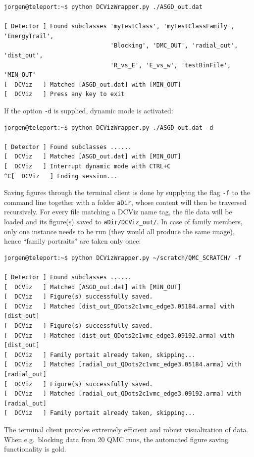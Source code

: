 \begin{verbatim}
jorgen@teleport:~$ python DCVizWrapper.py ./ASGD_out.dat 

[ Detector ] Found subclasses 'myTestClass', 'myTestClassFamily', 'EnergyTrail', 
                              'Blocking', 'DMC_OUT', 'radial_out', 'dist_out', 
                              'R_vs_E', 'E_vs_w', 'testBinFile', 'MIN_OUT'
[  DCViz   ] Matched [ASGD_out.dat] with [MIN_OUT]
[  DCViz   ] Press any key to exit
\end{verbatim}

If the option \verb+-d+ is supplied, dynamic mode is activated:

\begin{verbatim}
jorgen@teleport:~$ python DCVizWrapper.py ./ASGD_out.dat -d

[ Detector ] Found subclasses ......
[  DCViz   ] Matched [ASGD_out.dat] with [MIN_OUT]
[  DCViz   ] Interrupt dynamic mode with CTRL+C
^C[  DCViz   ] Ending session...
\end{verbatim}

Saving figures through the terminal client is done by supplying the flag \verb+-f+ to the command line together with a folder \verb+aDir+, whose content will then be traversed recursively. For every file matching a DCViz name tag, the file data will be loaded and its figure(s) saved to \verb+aDir/DCViz_out/+. In case of family members, only one instance needs to be run (they would all produce the same image), hence ``family portraits'' are taken only once:

\begin{verbatim}
jorgen@teleport:~$ python DCVizWrapper.py ~/scratch/QMC_SCRATCH/ -f

[ Detector ] Found subclasses ......
[  DCViz   ] Matched [ASGD_out.dat] with [MIN_OUT]
[  DCViz   ] Figure(s) successfully saved.
[  DCViz   ] Matched [dist_out_QDots2c1vmc_edge3.05184.arma] with [dist_out]
[  DCViz   ] Figure(s) successfully saved.
[  DCViz   ] Matched [dist_out_QDots2c1vmc_edge3.09192.arma] with [dist_out]
[  DCViz   ] Family portait already taken, skipping...
[  DCViz   ] Matched [radial_out_QDots2c1vmc_edge3.05184.arma] with [radial_out]
[  DCViz   ] Figure(s) successfully saved.
[  DCViz   ] Matched [radial_out_QDots2c1vmc_edge3.09192.arma] with [radial_out]
[  DCViz   ] Family portait already taken, skipping...
\end{verbatim}

The terminal client provides extremely efficient and robust visualization of data. When e.g.~blocking data from 20 QMC runs, the automated figure saving functionality is gold.  

